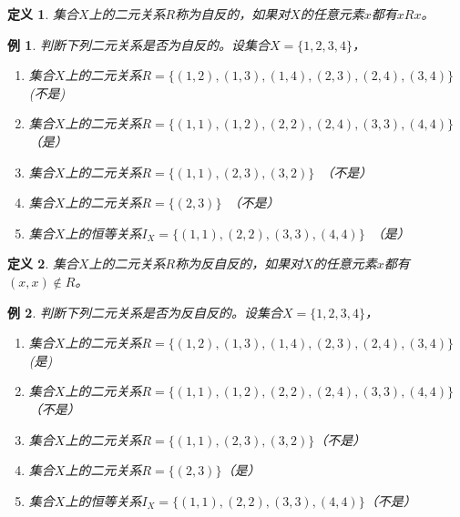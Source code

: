 \documentclass{article}
\newtheorem{Def}{定义}
\newtheorem{Example}{例}
\begin{document}
\begin{CJK*}{UTF8}{gbsn}
  \begin{Def}
    集合$X$上的二元关系$R$称为自反的，如果对$X$的任意元素$x$都有$xRx$。
  \end{Def}
  \begin{Example}
    
    判断下列二元关系是否为自反的。设集合$X=\{1,2,3,4\}$，
  \begin{enumerate}
  \item 集合$X$上的二元关系$R=\{(1,2), (1,3), (1,4), (2,3),
    (2,4), (3,4)\}$ (不是)
  \item 集合$X$上的二元关系$R=\{(1,1), (1,2), (2,2),
    (2,4), (3,3), (4,4)\}$　（是）
  \item 集合$X$上的二元关系$R = \{(1,1), (2,3), (3,2)\}$　（不是）
  \item 集合$X$上的二元关系$R = \{(2,3)\}$　（不是）
  \item 集合$X$上的恒等关系$I_X = \{(1,1), (2,2), (3,3),(4,4)\}$　（是）
  \end{enumerate}
  \end{Example}
  \begin{Def}
   集合$X$上的二元关系$R$称为反自反的，如果对$X$的任意元素$x$都有$(x,x) \notin R$。
 \end{Def}
 \begin{Example}   
    判断下列二元关系是否为反自反的。设集合$X=\{1,2,3,4\}$，
  \begin{enumerate}
  \item 集合$X$上的二元关系$R=\{(1,2), (1,3), (1,4), (2,3),
    (2,4), (3,4)\}$(是)
  \item 集合$X$上的二元关系$R=\{(1,1), (1,2), (2,2),
    (2,4), (3,3), (4,4)\}$　（不是）
  \item 集合$X$上的二元关系$R = \{(1,1), (2,3), (3,2)\}$（不是）
  \item 集合$X$上的二元关系$R = \{(2,3)\}$（是）
  \item 集合$X$上的恒等关系$I_X = \{(1,1), (2,2), (3,3),(4,4)\}$（不是）
  \end{enumerate}
 \end{Example}


\end{CJK*}
\end{document}
